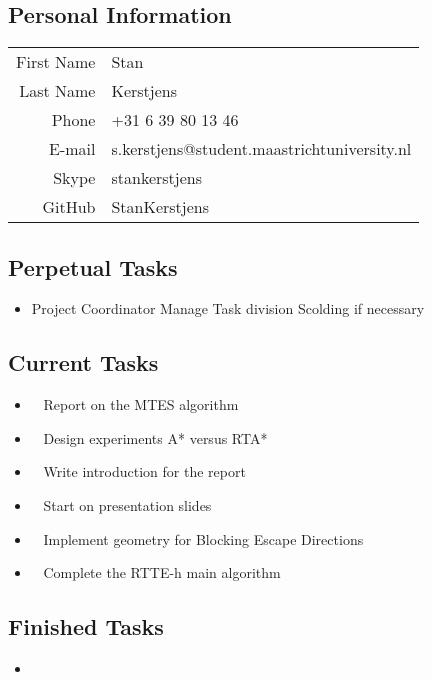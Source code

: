 \subsection{Personal Information}
\begin{table}[h!]
	\begin{tabular}{rl}
	First Name 	& Stan\\
	Last Name	& Kerstjens\\
	Phone		& +31 6 39 80 13 46\\
	E-mail		& s.kerstjens@student.maastrichtuniversity.nl\\
	Skype		& stankerstjens\\
	GitHub		& StanKerstjens
\end{tabular}
\end{table}

\subsection{Perpetual Tasks}
\begin{itemize}
	\item Project Coordinator
		\subitem Manage Task division
		\subitem Scolding if necessary
\end{itemize}

\subsection{Current Tasks}
\begin{itemize}
	\item~
	Report on the MTES algorithm
	\item~
	Design experiments
	\subitem A* versus RTA*
	\item~\marginpar{}
	Write introduction for the report
	\item~
	Start on presentation slides
	\item~
	Implement geometry for Blocking Escape Directions
	\item~
	Complete the RTTE-h main algorithm
\end{itemize}

\subsection{Finished Tasks}
\begin{itemize}
\item
\end{itemize}